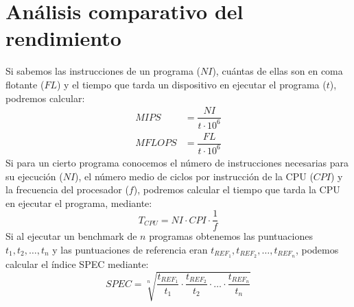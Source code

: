 \section{Análisis comparativo del rendimiento}
Si sabemos las instrucciones de un programa ($NI$), cuántas de ellas son en coma flotante ($FL$) y el tiempo que tarda un dispositivo en ejecutar el programa ($t$), podremos calcular:
\begin{align*}
    MIPS &= \dfrac{NI}{t\cdot 10^6} \\
    MFLOPS &= \dfrac{FL}{t\cdot 10^6}
\end{align*}
Si para un cierto programa conocemos el número de instrucciones necesarias para su ejecución ($NI$), el número medio de ciclos por instrucción de la CPU ($CPI$) y la frecuencia del procesador ($f$), podremos calcular el tiempo que tarda la CPU en ejecutar el programa, mediante:
\begin{equation*}
    T_{CPU} = NI\cdot CPI \cdot \dfrac{1}{f}
\end{equation*}
Si al ejecutar un benchmark de $n$ programas obtenemos las puntuaciones $t_1,t_2,\ldots,t_n$ y las puntuaciones de referencia eran $t_{REF_1}, t_{REF_2}, \ldots, t_{REF_n}$, podemos calcular el índice SPEC mediante:
\begin{equation*}
    SPEC = \sqrt[n]{\dfrac{t_{REF_1}}{t_1} \cdot \dfrac{t_{REF_2}}{t_2} \cdot \ldots \cdot \dfrac{t_{REF_n}}{t_n}}
\end{equation*}

